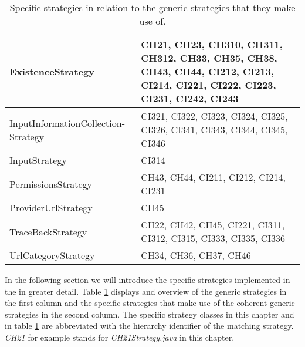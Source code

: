 \begin{table}
	\begin{center}

	\begin{tabular}{ | p{4.8cm} | p{9cm} | }
	\hline
		ExistenceStrategy & CH21, CH23, CH310, CH311, CH312, CH33, CH35, CH38, CH43, CH44, CI212, CI213, CI214, CI221, CI222, CI223, CI231, CI242, CI243 \\ \hline
		InputInformationCollection-Strategy & CI321, CI322, CI323, CI324, CI325, CI326, CI341, CI343, CI344, CI345, CI346 \\ \hline
		InputStrategy & CI314 \\ \hline
		PermissionsStrategy & CH43, CH44, CI211, CI212, CI214, CI231 \\ \hline
		ProviderUrlStrategy & CH45 \\ \hline
		TraceBackStrategy & CH22, CH42, CH45, CI221, CI311, CI312, CI315, CI333, CI335, CI336 \\ \hline
		UrlCategoryStrategy & CH34, CH36, CH37, CH46 \\ \hline
	\end{tabular}
	\end{center}
	
	\caption{Specific strategies in relation to the generic strategies that they make use of.} 
	\label{table:specStrategies}
\end{table}

In the following section we will introduce the specific strategies implemented in the \aiprat in greater detail.
Table \ref{table:specStrategies} displays and overview of the generic strategies in the first column and the specific strategies that make use of the coherent generic strategies in the second column.
The specific strategy classes in this chapter and in table \ref{table:specStrategies} are abbreviated with the \ipp hierarchy identifier of the matching strategy. 
\textit{CH21} for example stands for \textit{CH21\textunderscore Strategy.java} in this chapter.

